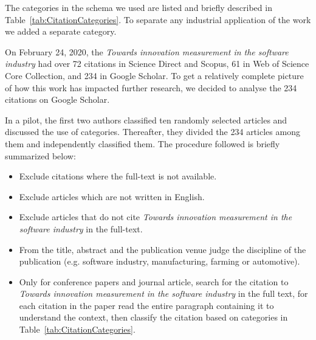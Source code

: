\documentclass[sigconf,review]{acmart}
\newcommand{\theArticle}{\textit{Towards innovation measurement in the software industry}}
\begin{document}
The categories in the schema we used are listed and briefly described in Table~\ref{tab:CitationCategories}. To separate any industrial application of the work we added a separate category. 

On February 24, 2020, the \theArticle{} had over 72 citations in Science Direct and Scopus, 61 in Web of Science Core Collection, and 234 in Google Scholar. To get a relatively complete picture of how this work has impacted further research, we decided to analyse the 234 citations on Google Scholar. 

In a pilot, the first two authors classified ten randomly selected articles and discussed the use of categories. Thereafter, they divided the 234 articles among them and  independently classified them. The procedure followed is briefly summarized below: 
\begin{itemize}
\item Exclude citations where the full-text is not available. 
\item Exclude articles which are not written in English.
\item Exclude articles  that do not cite \theArticle{} in the full-text.
\item From the title, abstract and the publication venue judge the discipline of the publication (e.g. software industry, manufacturing, farming or automotive).
\item Only for conference papers and journal article, search for the citation to \theArticle{} in the full text, for each citation in the paper  read the entire paragraph containing it to understand the context, then classify the citation based on categories in Table~\ref{tab:CitationCategories}.
\end{itemize}
 
\end{document}
